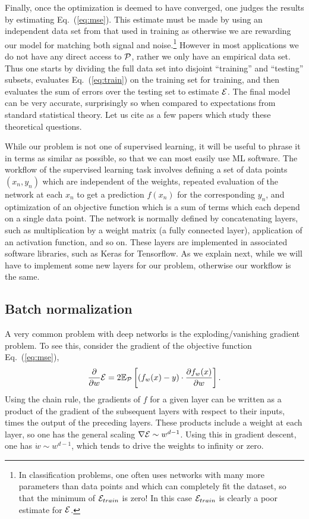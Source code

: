 \documentclass[12pt]{article}
\def\E#1#2{\mathbb{E}_{#1}\left[#2\right]}
\def\CP {{\cal P }}
\def\CE {{\cal E}}
\newcommand{\eq}[1]{Eq.~(\ref{eq:#1})}
\newcommand{\be}{\begin{equation}}
\newcommand{\ee}{\end{equation}}
\begin{document}
Finally, once the optimization is deemed to have converged, one judges the results by estimating \eq{mse}.
This estimate must be made by using an independent data set from that used in training as otherwise we are
rewarding our model for matching both signal and noise.\footnote{In classification problems, one often uses networks
with many more parameters than data points and which can completely fit the dataset, so that the minimum
of $\CE_{train}$ is zero!  In this case $\CE_{train}$ is clearly a poor estimate for $\CE$.}
However in most applications we do not have any direct access to $\CP$, rather we only have an empirical
data set.  Thus one starts by dividing the full data set into disjoint ``training'' and ``testing'' subsets, evaluates
\eq{train} on the training set for training, and then evaluates the sum of errors over the testing set to estimate $\CE$. 
The final model can be very accurate, surprisingly so when compared to expectations from standard
statistical theory.  Let us cite \cite{} as a few papers which study these theoretical questions.

While our problem is not one of supervised learning, it will be useful to phrase it in terms as similar
as possible, so that we can most easily use ML software.  The workflow of the supervised learning task involves defining
a set of data points $(x_n,y_n)$ which are independent of the weights, repeated evaluation of the network at each $x_n$
to get a prediction $f(x_n)$ for the corresponding $y_n$, and optimization of an objective function which is
a sum of terms which each depend on a single data point.
The network is normally defined by concatenating layers, such as multiplication by a weight matrix
(a fully connected layer), application of an activation function, and so on.  These layers are implemented
in associated software libraries, such as Keras for Tensorflow.  As we explain next,
while we will have to implement some new layers for our problem, otherwise our workflow is the same.

\subsection{ Batch normalization }

A very common problem with deep networks is the exploding/vanishing gradient problem.
To see this, consider the gradient of the objective function \eq{mse},
\be
\frac{ \partial  } { \partial w }\CE = 2\E{\CP}{ \left(f_w(x) - y\right)\cdot \frac{ \partial f_w(x) } { \partial w } }.
\ee
Using the chain rule, the gradients of $f$ for a given layer
can be written as a product of the gradient of the subsequent layers with respect to their inputs,
times the output of the preceding layers.
These products include a weight at each layer, so one has the general scaling $\nabla \CE \sim w^{d-1}$.
Using this in gradient descent, one has $\dot w \sim w^{d-1}$, which tends to drive the weights to
infinity or zero.
\end{document}
